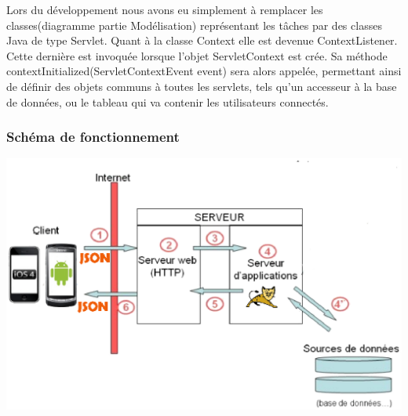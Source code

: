 	Lors du développement nous avons eu simplement à remplacer les
	classes(diagramme partie Modélisation) représentant les tâches par des classes
	Java de type Servlet. 
	Quant à la classe Context elle est devenue ContextListener.
	Cette dernière est
	invoquée lorsque l'objet ServletContext	est crée. Sa méthode contextInitialized(ServletContextEvent event) sera
	alors appelée, permettant ainsi de définir des objets communs à toutes les
	servlets, tels qu'un accesseur à la base de données, ou le tableau qui va
	contenir les utilisateurs connectés.
		

	\subsubsection{Schéma de fonctionnement }
		
		\begin{center}
			\includegraphics[width=16cm]{Analyse/Img/serveurappli.eps}
		\end{center}
		
